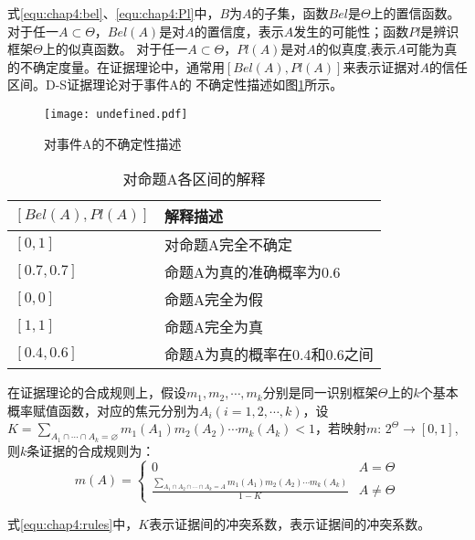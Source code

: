 式\ref{equ:chap4:bel}、\ref{equ:chap4:Pl}中，$B$为$A$的子集，函数$Bel$是$\Theta$上的置信函数。对于任一$A \subset \Theta$，$Bel(A)$是对$A$的置信度，表示$A$发生的可能性；函数$Pl$是辨识框架$\Theta$上的似真函数。
对于任一$A \subset \Theta$，$Pl(A)$是对$A$的似真度,表示$A$可能为真的不确定度量。在证据理论中，通常用$\left[Bel(A),Pl(A)\right]$来表示证据对$A$的信任区间。D-S证据理论对于事件A的
不确定性描述如图\ref{fig:undefined}所示。
\begin{figure}[H] %
  \centering
  \texttt{[image: undefined.pdf]}
  \caption{对事件A的不确定性描述}
  \label{fig:undefined}
\end{figure}
\begin{table}[htb]
  \centering
  \caption{对命题A各区间的解释}
  \label{tab:undefined}
    \begin{tabular}{C{5.5cm}C{6cm}}
      \toprule
      $\left[Bel(A),Pl(A)\right]$ & 解释描述 \\
      \midrule
      $\left[0,1\right]$ & 对命题A完全不确定 \\
      $\left[0.7,0.7\right]$ & 命题A为真的准确概率为0.6 \\
      $\left[0,0\right]$ & 命题A完全为假 \\
      $\left[1,1\right]$ & 命题A完全为真 \\
      $\left[0.4,0.6\right]$ & 命题A为真的概率在0.4和0.6之间 \\
      \bottomrule
    \end{tabular}
\end{table}

在证据理论的合成规则上，假设$m_1,m_2,\cdots,m_k$分别是同一识别框架$\Theta$上的$k$个基本概率赋值函数，对应的焦元分别为$A_i(i=1,2,\cdots,k)$，设
$K=\sum_{A_{1} \cap \cdots \cap A_{k} = \varnothing } m_{1}\left(A_{1}\right) m_{2}\left(A_{2}\right) \cdots m_{k}\left(A_{k}\right)<1$，若映射$m$:
$2^ \Theta \rightarrow \left[0,1\right]$,则$k$条证据的合成规则为：
\begin{equation}
\label{equ:chap4:rules}
m(A)=\left\{\begin{array}{ll}{0} & {A=\Theta} \\ {\frac{\sum_{A_{1} \cap A_{2} \cap \cdots \cap A_{k}=A} m_{1}\left(A_{1}\right) m_{2}\left(A_{2}\right) \cdots m_{k}\left(A_{k}\right)}{1-K}} & {A \neq \Theta}\end{array}\right.
\end{equation}

式\ref{equ:chap4:rules}中，$K$表示证据间的冲突系数，表示证据间的冲突系数。

